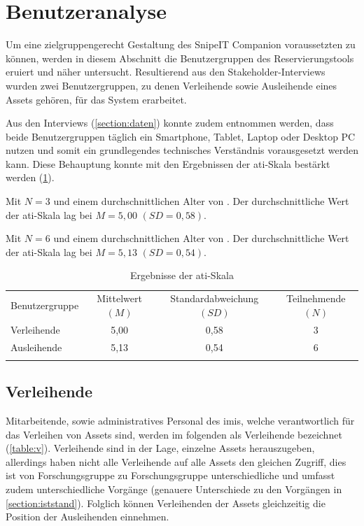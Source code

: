 \section{Benutzeranalyse}
\label{section:benutzer}
Um eine zielgruppengerecht Gestaltung des SnipeIT Companion voraussetzten zu können, werden in
diesem Abschnitt die Benutzergruppen des Reservierungstools eruiert und näher untersucht.
Resultierend aus den Stakeholder-Interviews wurden zwei Benutzergruppen, zu denen Verleihende sowie
Ausleihende eines Assets gehören, für das System erarbeitet.

Aus den Interviews (\ref{section:daten}) konnte zudem entnommen werden, dass beide Benutzergruppen
täglich ein Smartphone, Tablet, Laptop oder Desktop PC nutzen und somit ein grundlegendes
technisches Verständnis vorausgesetzt werden kann. Diese Behauptung konnte mit den Ergebnissen der
\ac{ati}-Skala bestärkt werden (\ref{table:ati}). 

Mit $N=3$ und einem durchschnittlichen Alter von .
Der durchschnittliche Wert der \ac{ati}-Skala lag bei $M=5,00$ $(SD=0,58)$.

Mit $N=6$ und einem durchschnittlichen Alter von .
Der durchschnittliche Wert der \ac{ati}-Skala lag bei $M=5,13$ $(SD=0,54)$.


\begin{table}[h]
        \centering
        \caption{Ergebnisse der \ac{ati}-Skala}
        \begin{tabular}{lccc}
                \arrayrulecolor{maincolor}\hline
                \sffamily\color{maincolor}Benutzergruppe & \sffamily\color{maincolor}Mittelwert $(M)$&
                \sffamily\color{maincolor}Standardabweichung $(SD)$ &
                \sffamily\color{maincolor}Teilnehmende $(N)$
                \\
                \arrayrulecolor{maincolor}\hline
                Verleihende & 5,00                                 & 0,58 & 3\\
                Ausleihende & 5,13                                 & 0,54 & 6\\
                \arrayrulecolor{maincolor}\hline
        \end{tabular}
        \label{table:ati}
\end{table}


\subsection*{Verleihende}
Mitarbeitende, sowie administratives Personal des \ac{imis}, welche verantwortlich für das Verleihen
von Assets sind, werden im folgenden als Verleihende bezeichnet (\ref{table:v}). Verleihende sind in
der Lage, einzelne Assets herauszugeben, allerdings haben nicht alle Verleihende auf alle Assets den
gleichen Zugriff, dies ist von Forschungsgruppe zu Forschungsgruppe unterschiedliche und umfasst
zudem unterschiedliche Vorgänge (genauere Unterschiede zu den Vorgängen in \ref{section:iststand}).
Folglich können Verleihenden der Assets gleichzeitig die Position der Ausleihenden einnehmen.

